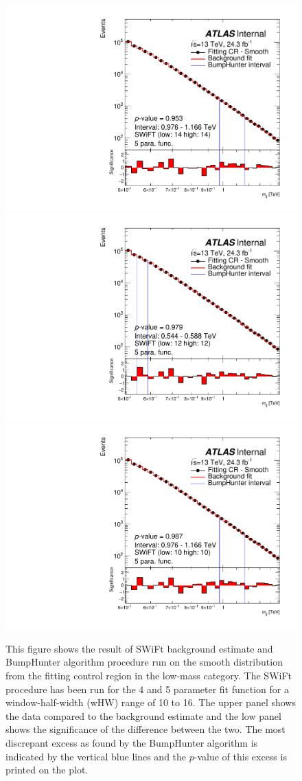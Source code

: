 \begin{figure}[!htb]
{  \includegraphics[width=0.3\linewidth, angle=0]{figs/Dibjet/LowMass/FitStudy/bhFit_corrFitCR_smooth_5para_low14_high14.pdf}
}
 {
  \includegraphics[width=0.3\linewidth, angle=0]{figs/Dibjet/LowMass/FitStudy/bhFit_corrFitCR_smooth_5para_low12_high12.pdf}
}
 {
  \includegraphics[width=0.3\linewidth, angle=0]{figs/Dibjet/LowMass/FitStudy/bhFit_corrFitCR_smooth_5para_low10_high10.pdf}
}
\vspace{10pt}
\caption{\label{fig:app-bhFit_lm_corrFitCR_smooth}
  This figure shows the result of SWiFt background estimate and {\sc BumpHunter} algorithm procedure run on the smooth distribution from the fitting control region in the low-mass category.
  The SWiFt procedure has been run for the 4 and 5 parameter fit function for a window-half-width (wHW) range of 10 to 16.
  The upper panel shows the data compared to the background estimate and the low panel shows the significance of the difference between the two.
  The most discrepant excess as found by the {\sc BumpHunter} algorithm is indicated by the vertical blue lines and the $p$-value of this excess is printed on the plot. }
\end{figure}



